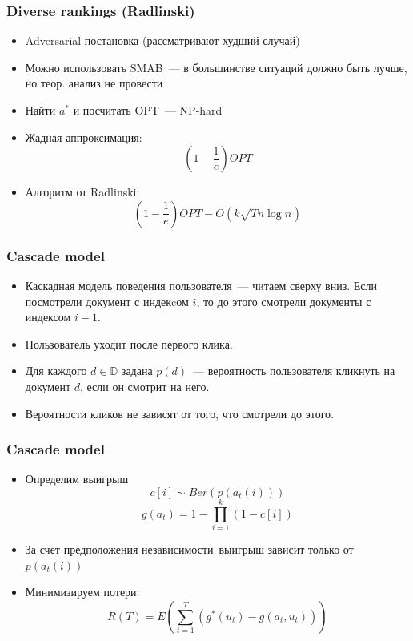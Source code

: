 \documentclass[xetex,mathserif,serif,table]{beamer}
\begin{document}
\begin{frame}
\frametitle{Diverse rankings (Radlinski)}

\begin{itemize}
\item  Adversarial  постановка (рассматривают худший случай)
\item Можно использовать SMAB — в большинстве ситуаций должно быть лучше, но теор. анализ не провести
\item Найти $a^{*}$ и посчитать OPT — NP-hard 
\item Жадная аппроксимация: 
$$(1 - \frac{1}{e})OPT$$
\item Алгоритм от Radlinski:
$$(1 - \frac{1}{e})OPT - O(k\sqrt{Tn \log n})$$
\end{itemize}

\end{frame}


\begin{frame}
\frametitle{Cascade model}

\begin{itemize}
\item Каскадная модель поведения пользователя — читаем сверху вниз. Если посмотрели документ с индекcом $i$, то до этого смотрели документы с индексом $i-1$.
\item Пользователь уходит после первого клика.
\item Для каждого $d \in \mathbb{D}$ задана $p(d)$ — вероятность пользователя кликнуть на документ $d$, если он смотрит на него.
\item Вероятности кликов не зависят от того, что смотрели до этого.

\end{itemize}

\end{frame}

\begin{frame}
\frametitle{Cascade model}
\begin{itemize}
  \item Определим выигрыш
  $$ c[i] \sim Ber(p(a_t(i)))$$
  $$g(a_{t}) = 1 - \prod\limits_{i=1}^{k}\left(1 - c[i]\right)$$
  \item За счет предположения независимости выигрыш зависит только от $p(a_t(i))$
  \item Минимизируем потери:
  $$R(T) = E\left(\sum\limits_{t=1}^{T} \left(g^{*}(u_t) - g(a_t, u_t)\right)\right)$$
\end{itemize}
\end{frame}
 
\end{document}
